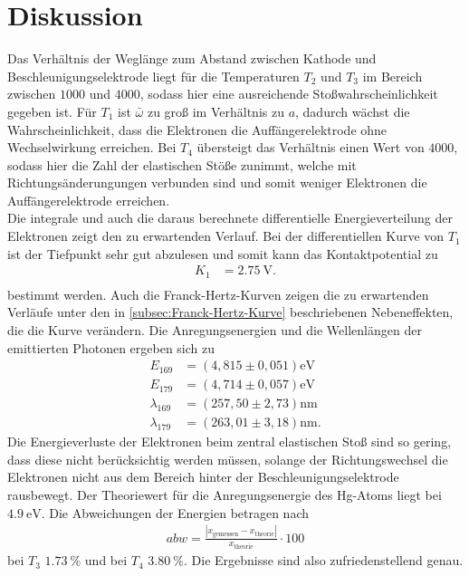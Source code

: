\section{Diskussion}
\label{sec:Diskussion}

Das Verhältnis der Weglänge zum Abstand zwischen Kathode und Beschleunigungselektrode liegt für die Temperaturen $T_2$ und $T_3$
im Bereich zwischen $1000$ und $4000$, sodass hier eine ausreichende Stoßwahrscheinlichkeit gegeben ist.
Für $T_1$ ist $\bar{\omega}$ zu groß im Verhältnis zu $a$, dadurch wächst die Wahrscheinlichkeit, dass die Elektronen die Auffängerelektrode
ohne Wechselwirkung erreichen.
Bei $T_4$ übersteigt das Verhältnis einen Wert von $4000$, sodass hier die Zahl der elastischen Stöße zunimmt, welche mit 
Richtungsänderungungen verbunden sind und somit weniger Elektronen die Auffängerelektrode erreichen.\\

Die integrale und auch die daraus berechnete differentielle Energieverteilung der Elektronen zeigt den zu erwartenden Verlauf.
Bei der differentiellen Kurve von $T_1$ ist der Tiefpunkt sehr gut abzulesen und somit kann das Kontaktpotential zu 
\begin{align*}
    K_1 &= \qty{2.75}{\volt}.\\
\end{align*}
bestimmt werden.
Auch die Franck-Hertz-Kurven zeigen die zu erwartenden Verläufe unter den in \autoref{subsec:Franck-Hertz-Kurve} beschriebenen Nebeneffekten,
die die Kurve verändern.
Die Anregungsenergien und die Wellenlängen der emittierten Photonen ergeben sich zu
\begin{align*}
    E_{169} &= (4,815 \pm 0,051) \si{\electronvolt}\\
    E_{179} &= (4,714 \pm 0,057) \si{\electronvolt}\\
    \lambda_{169} &= (257,50 \pm 2,73) \si{\nano\meter}\\
    \lambda_{179} &= (263,01 \pm 3,18) \si{\nano\meter}.
\end{align*}
Die Energieverluste der Elektronen beim zentral elastischen Stoß sind
so gering, dass diese nicht berücksichtig werden müssen, solange der Richtungswechsel die 
Elektronen nicht aus dem Bereich hinter der Beschleunigungselektrode rausbewegt.
Der Theoriewert für die Anregungsenergie des Hg-Atoms liegt bei $\qty{4.9}{\electronvolt}$\cite{Anregungsenergie}.
Die Abweichungen der Energien betragen nach 
\begin{align*}
    abw=\frac{|x_\mathrm{gemessen}-x_\mathrm{theorie}|}{x_\mathrm{theorie}}\cdot 100 \label{eqn:abweich}
\end{align*}
bei $T_3$ $\qty{1.73}{\percent}$ und bei $T_4$ $\qty{3.80}{\percent}$.
Die Ergebnisse sind also zufriedenstellend genau.\\


